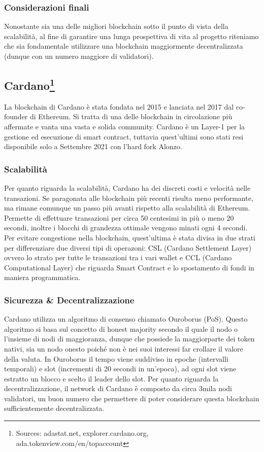 \documentclass[a4paper, 12pt]{article}
\begin{document}
\subsubsection*{Considerazioni finali}
Nonostante sia una delle migliori blockchain sotto il punto di vista della scalabilità, al fine di garantire una lunga prospettiva di vita al progetto riteniamo che sia fondamentale utilizzare una blockchain maggiormente decentralizzata (dunque con un numero maggiore di validatori).

\newpage
\subsection*{Cardano\footnote{Sources: adastat.net, explorer.cardano.org, ada.tokenview.com/en/topaccount}}
La blockchain di Cardano è stata fondata nel 2015 e lanciata nel 2017 dal co-founder di Ethereum. Si tratta di una delle blockchain in circolazione più affermate e vanta una vasta e solida community. Cardano è un Layer-1 per la gestione ed esecuzione di smart contract, tuttavia quest'ultimi sono stati resi disponibile solo a Settembre 2021 con l'hard fork Alonzo.
\subsubsection*{Scalabilità}
Per quanto riguarda la scalabilità, Cardano ha dei discreti costi e velocità nelle transazioni. Se paragonata alle blockchain più recenti risulta meno performante, ma rimane comunque un passo più avanti rispetto alla scalabilità di Ethereum. Permette di effettuare transazioni per circa 50 centesimi in più o meno 20 secondi, inoltre i blocchi di grandezza ottimale vengono minati ogni 4 secondi. Per evitare congestione nella blockchain, quest'ultima è stata divisa in due strati per differenziare due diversi tipi di operazoni: CSL (Cardano Settlement Layer) ovvero lo strato per tutte le transazioni tra i vari wallet e CCL (Cardano Computational Layer) che riguarda Smart Contract e lo spostamento di fondi in maniera programmatica.
\subsubsection*{Sicurezza \& Decentralizzazione}
Cardano utilizza un algoritmo di consenso chiamato Ouroborus (PoS). Questo algoritmo si basa sul concetto di honest majority secondo il quale il nodo o l'insieme di nodi di maggioranza, dunque che possiede la maggiorparte dei token nativi, sia un nodo onesto poiché non è nei suoi interessi far crollare il valore della valuta. In Ouroborus il tempo viene suddiviso in epoche (intervalli temporali) e slot (incrementi di 20 secondi in un'epoca), ad ogni slot viene estratto un blocco e scelto il leader dello slot.
Per quanto riguarda la decentralizzazione, il network di Cardano è composto da circa 3mila nodi validatori, un buon numero che permettere di poter considerare questa blockchain sufficientemente decentralizzata.
\end{document}
